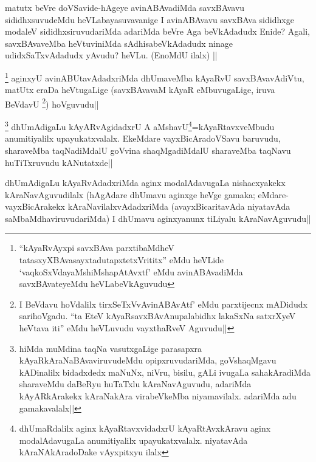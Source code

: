 \begin{artha}
matutx beVre doVSavide-hAgeye avinABAvadiMda savxBAvavu sididhxsuvudeMdu heVLabayasuvavanige I avinABAvavu savxBAva sididhxge modaleV sididhxsiruvudariMda adariMda beVre Aga beVkAdadudx Enide? Agali, savxBAvaveMba heVtuviniMda sAdhisabeVkAdadudx ninage udidxSaTxvAdadudx yAvudu? heVLu. (EnoMdU ilalx) || 
\end{artha}


\begin{artha}
\footnote[1]{``kAyaRvAyxpi savxBAva parxtibaMdheV tatasxyXBAvasayxtadutapxtetxVrititx'' eMdu heVLide `vaqkoSxVdayaMshiMshapAtAvxtf' eMdu avinABAvadiMda savxBAvateyeMdu heVLabeVkAguvudu}
aginxyU avinABUtavAdadxriMda dhUmaveMba kAyaRvU savxBAvavAdiVtu, matUtx eraDa heVtugaLige (savxBAvavaM kAyaR eMbuvugaLige, iruva BeVdavU \footnote[2]{I BeVdavu hoVdalilx tirxSeTxVvAvinABAvAtf' eMdu parxtijecnx mADidudx sarihoVgadu. ``ta EteV kAyaRsavxBAvAnupalabidhx lakaSxNa satxrXyeV heVtava iti'' eMdu heVLuvudu vayxthaRveV Aguvudu||}) hoVguvudu||
\end{artha}


\begin{artha}
\footnote[4]{hiMda muMdina taqNa vasutxgaLige parasapxra kAyaRkAraNaBAvaviruvudeMdu opipxruvudariMda, goVshaqMgavu kADinalilx bidadxdedx maNuNx, niVru, bisilu, gALi ivugaLa sahakAradiMda sharaveMdu daBeRyu huTaTxlu kAraNavAguvudu, adariMda kAyARkArakekx kAraNakAra virabeVkeMba niyamavilalx. adariMda adu gamakavalalx||}
dhUmAdigaLu kAyARvAgidadxrU A aMshavU\footnote[3]{dhUmaRdalilx aginx kAyaRtavxvidadxrU kAyaRtAvxkAravu aginx modalAdavugaLa anumitiyalilx upayukatxvalalx. niyatavAda kAraNAkAradoDake vAyxpitxyu ilalx}=kAyaRtavxveMbudu anumitiyalilx upayukatxvalalx. EkeMdare vayxBicAradoVSavu baruvudu, sharaveMba taqNadiMdalU goVvina shaqMgadiMdalU sharaveMba taqNavu huTiTxruvudu kANutatxde||
\end{artha}


\begin{artha}
dhUmAdigaLu kAyaRvAdadxriMda aginx modalAdavugaLa nishacxyakekx kAraNavAguvudilalx (hAgAdare dhUmavu aginxge heVge gamaka; eMdare- vayxBicArakekx kAraNavilalxvAdadxriMda (avayxBicaritavAda niyatavAda saMbaMdhaviruvudariMda) I dhUmavu aginxyanunx tiLiyalu kAraNavAguvudu||
\end{artha}

